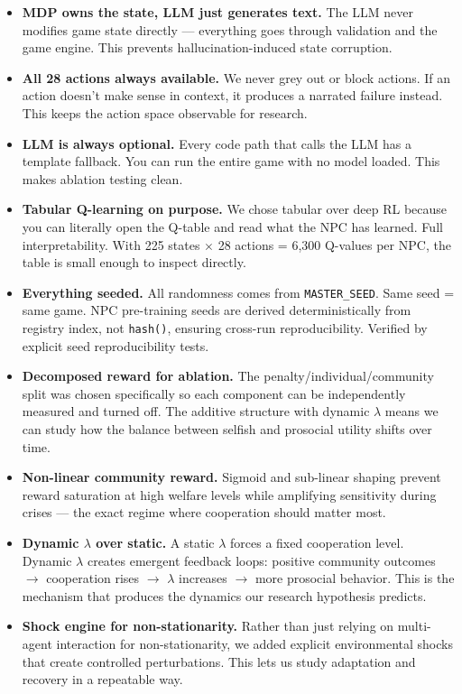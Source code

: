 \begin{itemize}
    \item \textbf{MDP owns the state, LLM just generates text.} The LLM never modifies game state directly --- everything goes through validation and the game engine. This prevents hallucination-induced state corruption.

    \item \textbf{All 28 actions always available.} We never grey out or block actions. If an action doesn't make sense in context, it produces a narrated failure instead. This keeps the action space observable for research.

    \item \textbf{LLM is always optional.} Every code path that calls the LLM has a template fallback. You can run the entire game with no model loaded. This makes ablation testing clean.

    \item \textbf{Tabular Q-learning on purpose.} We chose tabular over deep RL because you can literally open the Q-table and read what the NPC has learned. Full interpretability. With 225 states $\times$ 28 actions = 6,300 Q-values per NPC, the table is small enough to inspect directly.

    \item \textbf{Everything seeded.} All randomness comes from \texttt{MASTER\_SEED}. Same seed = same game. NPC pre-training seeds are derived deterministically from registry index, not \texttt{hash()}, ensuring cross-run reproducibility. Verified by explicit seed reproducibility tests.

    \item \textbf{Decomposed reward for ablation.} The penalty/individual/community split was chosen specifically so each component can be independently measured and turned off. The additive structure with dynamic $\lambda$ means we can study how the balance between selfish and prosocial utility shifts over time.

    \item \textbf{Non-linear community reward.} Sigmoid and sub-linear shaping prevent reward saturation at high welfare levels while amplifying sensitivity during crises --- the exact regime where cooperation should matter most.

    \item \textbf{Dynamic $\lambda$ over static.} A static $\lambda$ forces a fixed cooperation level. Dynamic $\lambda$ creates emergent feedback loops: positive community outcomes $\to$ cooperation rises $\to$ $\lambda$ increases $\to$ more prosocial behavior. This is the mechanism that produces the dynamics our research hypothesis predicts.

    \item \textbf{Shock engine for non-stationarity.} Rather than just relying on multi-agent interaction for non-stationarity, we added explicit environmental shocks that create controlled perturbations. This lets us study adaptation and recovery in a repeatable way.
\end{itemize}

